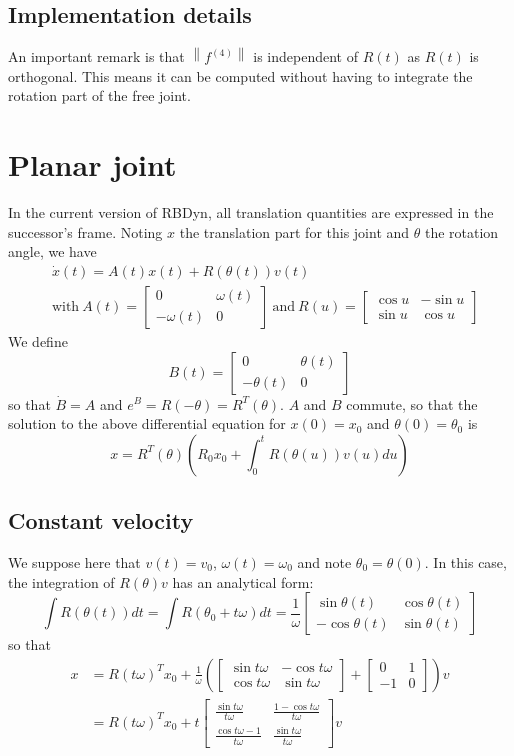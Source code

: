 \documentclass[]{article}
\newcommand{\BIN}{\begin{bmatrix}}
\newcommand{\BOUT}{\end{bmatrix}}
\newcommand{\norm}[1]{\left\| #1 \right\|}
\newcommand{\w}{\omega}
\begin{document}
\subsection{Implementation details}
An important remark is that $\norm{f^{(4)}}$ is independent of $R(t)$ as $R(t)$ is orthogonal. This means it can be computed without having to integrate the rotation part of the free joint.
\newline



\section{Planar joint}
In the current version of RBDyn, all translation quantities are expressed in the successor's frame. Noting $x$ the translation part for this joint and $\theta$ the rotation angle, we have
\begin{align}
&\dot{x}(t) = A(t) x(t) + R(\theta(t)) v(t)\\ 
&\mbox{with}\ A(t) = \BIN 0 & \w(t) \\ -\w(t) & 0 \BOUT \ \mbox{and}\ R(u) = \BIN \cos{u} & -\sin{u} \\ \sin{u} & \cos{u}\BOUT \nonumber
\end{align}
We define
\begin{equation}
	B(t) = \BIN 0 & \theta(t) \\ -\theta(t) & 0 \BOUT
\end{equation}
so that $\dot{B} = A$ and $e^B = R(-\theta) = R^T(\theta)$. $A$ and $B$ commute, so that the solution to the above differential equation for $x(0) = x_0$ and $\theta(0) = \theta_0$ is
\begin{equation}
	x = R^T(\theta)\left(R_0 x_0 + \int_0^t R(\theta(u))v(u) du \right) \label{eq:planarSol}
\end{equation}


\subsection{Constant velocity}
We suppose here that $v(t) = v_0$, $\w(t) = \w_0$ and note $\theta_0 = \theta(0)$.\newline
In this case, the integration of $R(\theta)v$ has an analytical form:
\begin{equation}
	\int R(\theta(t)) dt = \int R(\theta_0+ t \w) dt = \frac{1}{\w} \BIN \sin{\theta(t)} & \cos{\theta(t)} \\ -\cos{\theta(t)} & \sin{\theta(t)} \BOUT
\end{equation}
so that
\begin{align}
	x & = R(t\w)^T x_0 + \frac{1}{\w}\left( \BIN \sin{t \w} &-\cos{t \w} \\ \cos{t \w} & \sin{t \w} \BOUT + \BIN 0 & 1 \\ -1 & 0 \BOUT \right) v \\
	  & = R(t\w)^T x_0 + t \BIN \frac{\sin{t \w}}{t \w} & \frac{1-\cos{t \w}}{t \w} \\ \frac{\cos{t \w}-1}{t \w} & \frac{\sin{t \w}}{t \w} \BOUT v
\end{align}
\end{document}
